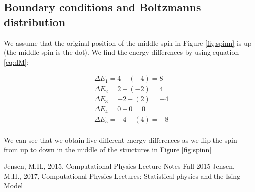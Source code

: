 \documentclass{article}
\begin{document}
\subsection*{Boundary conditions and Boltzmanns distribution}

We assume that the original position of the middle spin in Figure \ref{fig:spinn} is up (the middle spin is the dot). We find the energy differences by using equation \ref{eq:dM}:

\begin{equation}\label{eq:calc_dE}
\begin{split}
&\Delta E_1 = 4-(-4)=8\\
&\Delta E_2 = 2-(-2)=4\\
&\Delta E_3 = -2-(2)=-4\\
&\Delta E_4 = 0-0=0\\
&\Delta E_5 = -4-(4)=-8\\
\end{split}
\end{equation}

We can see that we obtain five different energy differences as we flip the spin from up to down in the middle of the structures in Figure \ref{fig:spinn}.

\begin{thebibliography}{9}
	Jensen, M.H., 2015, Computational Physics Lecture Notes Fall 2015
	Jensen, M.H., 2017, Computational Physics Lectures: Statistical physics and the Ising Model
\end{thebibliography}
\end{document}

